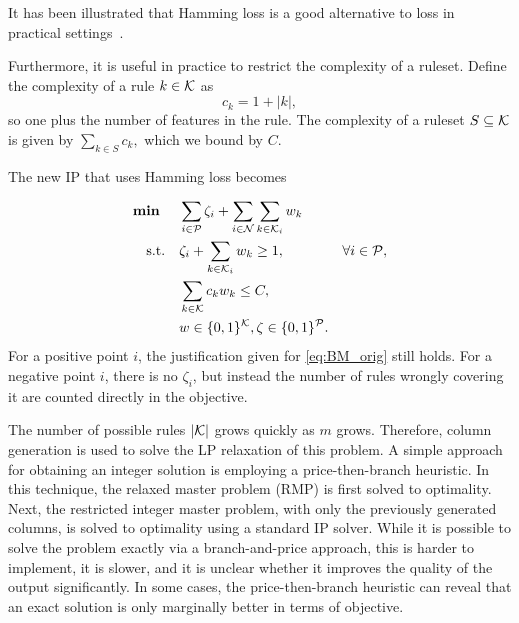 It has been illustrated that Hamming loss is a good alternative to \zo loss in practical settings~\cite{lawless_interpretable_2023}.

Furthermore, it is useful in practice to restrict the complexity of a ruleset.
Define the complexity of a rule $k \in \mathcal{K}$ as
\begin{equation}
    c_k = 1 + |k|, \label{eq:boolean_ck}
\end{equation}
so one plus the number of features in the rule.
The complexity of a ruleset $S \subseteq \mathcal{K}$ is given by $\sum_{k\in S} c_k,$ which we bound by $C$.

The new IP that uses Hamming loss becomes

\begin{subequations}
    \label{eq:BM}
    \begin{align}
        \mathbf{\text{\textbf{min }}} \quad & \sum_{i \in \mathcal{P}} \zeta_i + \sum_{i \in \mathcal{N}} \sum_{k \in \mathcal{K}_i} w_k \label{eq:BM-obj} \\
        \mathbf{\text{s.t.}} \quad & \zeta_i + \sum_{k \in \mathcal{K}_i} w_k \geq 1, & \forall i \in \mathcal{P}, \label{eq:BM-misP} \\
        & \sum_{k \in \mathcal{K}} c_k w_k \leq C, & \label{eq:BM-complex} \\
        & w \in \{0, 1\}^{\mathcal{K}}, \zeta \in \{0, 1\}^{\mathcal{P}}. \label{eq:BM-binary2}
    \end{align}
\end{subequations}
For a positive point $i$, the justification given for \eqref{eq:BM_orig} still holds.
For a negative point $i$, there is no $\zeta_i$, but instead the number of rules wrongly covering it are counted
directly in the objective.

The number of possible rules $|\mathcal{K}|$ grows quickly as $m$ grows.
Therefore, column generation is used to solve the LP relaxation of this problem.
A simple approach for obtaining an integer solution is employing a price-then-branch heuristic.
In this technique, the relaxed master problem (RMP) is first solved to optimality.
Next, the restricted integer master problem, with only the previously generated columns, is solved to optimality using a standard IP solver.
While it is possible to solve the problem exactly via a branch-and-price approach,
this is harder to implement, it is slower,
and it is unclear whether it improves the quality of the output significantly.
In some cases, the price-then-branch heuristic can reveal that an exact solution is
only marginally better in terms of objective.